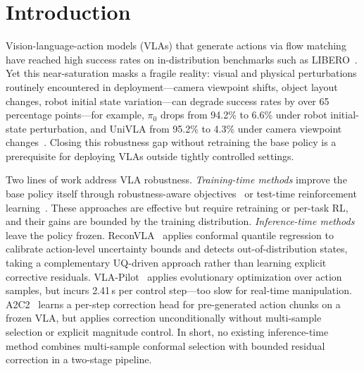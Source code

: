\section{Introduction}
\label{sec:intro}

Vision-language-action models (VLAs) that generate actions via flow matching~\cite{black2024pi0,shukor2025smolvla,lipman2023flow} have reached high success rates on in-distribution benchmarks such as LIBERO~\cite{liu2023libero}.
Yet this near-saturation masks a fragile reality: visual and physical perturbations routinely encountered in deployment---camera viewpoint shifts, object layout changes, robot initial state variation---can degrade success rates by over 65 percentage points---for example, $\pi_0$ drops from 94.2\% to 6.6\% under robot initial-state perturbation, and UniVLA from 95.2\% to 4.3\% under camera viewpoint changes~\cite{fei2025liberoplus}.
Closing this robustness gap without retraining the base policy is a prerequisite for deploying VLAs outside tightly controlled settings.

Two lines of work address VLA robustness.
\emph{Training-time methods} improve the base policy itself through robustness-aware objectives~\cite{srpo2025,robustvla2025,digflow2025} or test-time reinforcement learning~\cite{liu2026ttvla}.
These approaches are effective but require retraining or per-task RL, and their gains are bounded by the training distribution.
\emph{Inference-time methods} leave the policy frozen.
ReconVLA~\cite{chen2026reconvla} applies conformal quantile regression to calibrate action-level uncertainty bounds and detects out-of-distribution states, taking a complementary UQ-driven approach rather than learning explicit corrective residuals.
VLA-Pilot~\cite{li2025vlapilot} applies evolutionary optimization over action samples, but incurs 2.41\,s per control step---too slow for real-time manipulation.
A2C2~\cite{a2c2_2025} learns a per-step correction head for pre-generated action chunks on a frozen VLA, but applies correction unconditionally without multi-sample selection or explicit magnitude control.
In short, no existing inference-time method combines multi-sample conformal selection with bounded residual correction in a two-stage pipeline.

